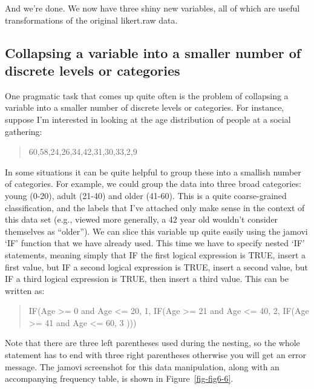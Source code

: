\documentclass[
  a4paper,
]{book}
\begin{document}
And we're done. We now have three shiny new variables, all of which are
useful transformations of the original likert.raw data.

\hypertarget{collapsing-a-variable-into-a-smaller-number-of-discrete-levels-or-categories}{%
\subsection{Collapsing a variable into a smaller number of discrete
levels or
categories}\label{collapsing-a-variable-into-a-smaller-number-of-discrete-levels-or-categories}}

One pragmatic task that comes up quite often is the problem of
collapsing a variable into a smaller number of discrete levels or
categories. For instance, suppose I'm interested in looking at the age
distribution of people at a social gathering:

\begin{quote}
60,58,24,26,34,42,31,30,33,2,9
\end{quote}

In some situations it can be quite helpful to group these into a
smallish number of categories. For example, we could group the data into
three broad categories: young (0-20), adult (21-40) and older (41-60).
This is a quite coarse-grained classification, and the labels that I've
attached only make sense in the context of this data set (e.g., viewed
more generally, a 42 year old wouldn't consider themselves as
``older''). We can slice this variable up quite easily using the jamovi
`IF' function that we have already used. This time we have to specify
nested `IF' statements, meaning simply that IF the first logical
expression is TRUE, insert a first value, but IF a second logical
expression is TRUE, insert a second value, but IF a third logical
expression is TRUE, then insert a third value. This can be written as:

\begin{quote}
IF(Age \textgreater= 0 and Age \textless= 20, 1, IF(Age \textgreater= 21
and Age \textless= 40, 2, IF(Age \textgreater= 41 and Age \textless= 60,
3 )))
\end{quote}

Note that there are three left parentheses used during the nesting, so
the whole statement has to end with three right parentheses otherwise
you will get an error message. The jamovi screenshot for this data
manipulation, along with an accompanying frequency table, is shown in
Figure~\ref{fig-fig6-6}.
\end{document}

